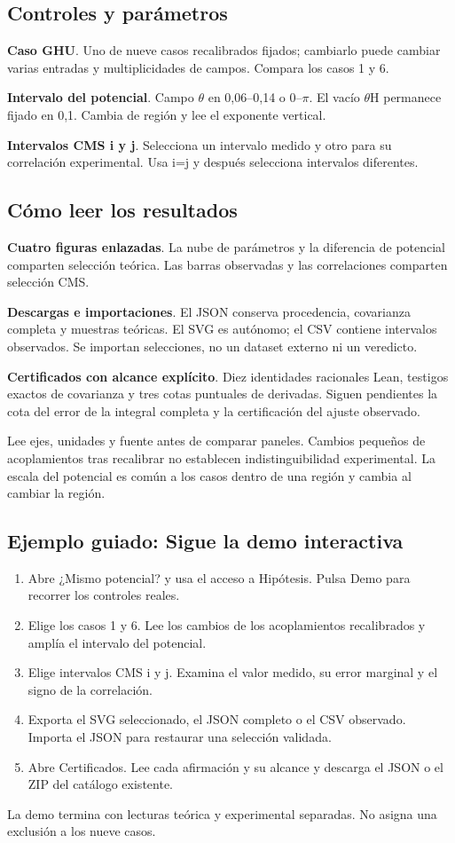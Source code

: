 \documentclass[11pt,a4paper]{article}
\begin{document}
\subsection*{Controles y parámetros}
\textbf{Caso GHU}. Uno de nueve casos recalibrados fijados; cambiarlo puede cambiar varias entradas y multiplicidades de campos. Compara los casos 1 y 6.

\textbf{Intervalo del potencial}. Campo \ensuremath{\theta} en 0,06--0,14 o 0--\ensuremath{\pi}. El vacío \ensuremath{\theta}H permanece fijado en 0,1. Cambia de región y lee el exponente vertical.

\textbf{Intervalos CMS i y j}. Selecciona un intervalo medido y otro para su correlación experimental. Usa i=j y después selecciona intervalos diferentes.

\subsection*{Cómo leer los resultados}
\textbf{Cuatro figuras enlazadas}. La nube de parámetros y la diferencia de potencial comparten selección teórica. Las barras observadas y las correlaciones comparten selección CMS.

\textbf{Descargas e importaciones}. El JSON conserva procedencia, covarianza completa y muestras teóricas. El SVG es autónomo; el CSV contiene intervalos observados. Se importan selecciones, no un dataset externo ni un veredicto.

\textbf{Certificados con alcance explícito}. Diez identidades racionales Lean, testigos exactos de covarianza y tres cotas puntuales de derivadas. Siguen pendientes la cota del error de la integral completa y la certificación del ajuste observado.

Lee ejes, unidades y fuente antes de comparar paneles. Cambios pequeños de acoplamientos tras recalibrar no establecen indistinguibilidad experimental. La escala del potencial es común a los casos dentro de una región y cambia al cambiar la región.
\subsection*{Ejemplo guiado: Sigue la demo interactiva}
\begin{enumerate}
\item Abre ¿Mismo potencial? y usa el acceso a Hipótesis. Pulsa Demo para recorrer los controles reales.
\item Elige los casos 1 y 6. Lee los cambios de los acoplamientos recalibrados y amplía el intervalo del potencial.
\item Elige intervalos CMS i y j. Examina el valor medido, su error marginal y el signo de la correlación.
\item Exporta el SVG seleccionado, el JSON completo o el CSV observado. Importa el JSON para restaurar una selección validada.
\item Abre Certificados. Lee cada afirmación y su alcance y descarga el JSON o el ZIP del catálogo existente.
\end{enumerate}
La demo termina con lecturas teórica y experimental separadas. No asigna una exclusión a los nueve casos.
\end{document}
